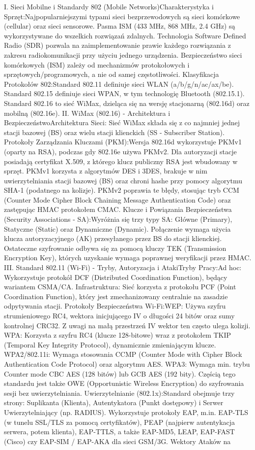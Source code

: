 I. Sieci Mobilne i Standardy 802 (Mobile Networks)Charakterystyka i Sprzęt:Najpopularniejszymi typami sieci bezprzewodowych są sieci komórkowe (cellular) oraz sieci sensorowe.  Pasma ISM (433 MHz, 868 MHz, 2.4 GHz) są wykorzystywane do wszelkich rozwiązań zdalnych.  Technologia Software Defined Radio (SDR) pozwala na zaimplementowanie prawie każdego rozwiązania z zakresu radiokomunikacji przy użyciu jednego urządzenia.  Bezpieczeństwo sieci komórkowych (ISM) zależy od mechanizmów protokołowych i sprzętowych/programowych, a nie od samej częstotliwości.  Klasyfikacja Protokołów 802:Standard 802.11 definiuje sieci WLAN (a/b/g/n/ac/ax/be).  Standard 802.15 definiuje sieci WPAN, w tym technologię Bluetooth (802.15.1).  Standard 802.16 to sieć WiMax, dzieląca się na wersję stacjonarną (802.16d) oraz mobilną (802.16e).  II. WiMax (802.16) - Architektura i BezpieczeństwoArchitektura Sieci: Sieć WiMax składa się z co najmniej jednej stacji bazowej (BS) oraz wielu stacji klienckich (SS - Subscriber Station).  Protokoły Zarządzania Kluczami (PKM):Wersja 802.16d wykorzystuje PKMv1 (oparty na RSA), podczas gdy 802.16e używa PKMv2.  Dla autoryzacji stacje posiadają certyfikat X.509, z którego klucz publiczny RSA jest wbudowany w sprzęt.  PKMv1 korzysta z algorytmów DES i 3DES, brakuje w nim uwierzytelniania stacji bazowej (BS) oraz chroni hashe przy pomocy algorytmu SHA-1 (podatnego na kolizje).  PKMv2 poprawia te błędy, stosując tryb CCM (Counter Mode Cipher Block Chaining Message Authentication Code) oraz zastępując HMAC protokołem CMAC.  Klucze i Powiązania Bezpieczeństwa (Security Associations - SA):Wyróżnia się trzy typy SA: Główne (Primary), Statyczne (Static) oraz Dynamiczne (Dynamic).  Połączenie wymaga użycia klucza autoryzacyjnego (AK) przesyłanego przez BS do stacji klienckiej.  Ostateczne szyfrowanie odbywa się za pomocą kluczy TEK (Transmission Encryption Key), których uzyskanie wymaga poprawnej weryfikacji przez HMAC.  III. Standard 802.11 (Wi-Fi) - Tryby, Autoryzacja i AtakiTryby Pracy:Ad hoc: Wykorzystuje protokół DCF (Distributed Coordination Function), będący wariantem CSMA/CA.  Infrastruktura: Sieć korzysta z protokołu PCF (Point Coordination Function), który jest zmechanizowany centralnie na zasadzie odpytywania stacji.  Protokoły Bezpieczeństwa Wi-Fi:WEP: Używa szyfru strumieniowego RC4, wektora inicjującego IV o długości 24 bitów oraz sumy kontrolnej CRC32. Z uwagi na małą przestrzeń IV wektor ten często ulega kolizji.  WPA: Korzysta z szyfru RC4 (klucze 128-bitowe) wraz z protokołem TKIP (Temporal Key Integrity Protocol), dynamicznie zmieniającym klucze.  WPA2/802.11i: Wymaga stosowania CCMP (Counter Mode with Cipher Block Authentication Code Protocol) oraz algorytmu AES.  WPA3: Wymaga min. trybu Counter mode CBC AES (128 bitów) lub GCB AES (192 bity). Częścią tego standardu jest także OWE (Opportunistic Wireless Encryption) do szyfrowania sesji bez uwierzytelniania.  Uwierzytelnianie (802.1x):Standard obejmuje trzy strony: Suplikanta (Klienta), Autentykatora (Punkt dostępowy) i Serwer Uwierzytelniający (np. RADIUS).  Wykorzystuje protokoły EAP, m.in. EAP-TLS (w tunelu SSL/TLS za pomocą certyfikatów), PEAP (najpierw autentykacja serwera, potem klienta), EAP-TTLS, a także EAP-MD5, LEAP, EAP-FAST (Cisco) czy EAP-SIM / EAP-AKA dla sieci GSM/3G.  Wektory Ataków na 